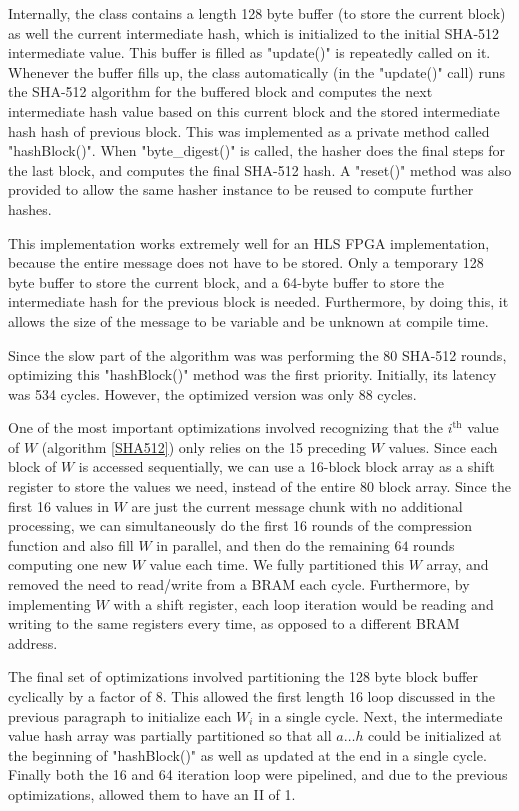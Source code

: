 Internally, the class contains a length 128 byte buffer (to store the current block)
as well the current intermediate hash,
which is initialized to the initial SHA-512 intermediate value. This buffer is filled as
"update()" is repeatedly called on it. Whenever the buffer fills up, the class
automatically (in the "update()" call) runs the SHA-512 algorithm for the buffered block
and computes the next intermediate hash value based on this current block and the stored intermediate hash hash of previous block.
This was implemented as a private method called "hashBlock()".
When "byte_digest()" is called, the hasher does the final steps for the last block,
and computes the final SHA-512 hash. A "reset()" method was also provided to allow the same hasher
instance to be reused to compute further hashes.

This implementation works extremely well for an HLS FPGA implementation, because
the entire message does not have to be stored. Only a temporary 128 byte buffer
to store the current block, and a 64-byte buffer to store the intermediate hash for the previous block is needed.
Furthermore, by doing this, it allows the size of the message to be variable and be unknown at compile time.

Since the slow part of the algorithm was was performing the 80 SHA-512 rounds,
optimizing this "hashBlock()" method was the first priority. Initially, its
latency was 534 cycles. However, the optimized version was only 88 cycles.

One of the most important optimizations
involved recognizing that the $i^{\text{th}}$ value of $W$ (algorithm \ref{SHA512}) only relies on the 15 preceding $W$ values.
Since each block of $W$ is accessed sequentially, we can use a 16-block block array as a shift register
to store the values we need, instead of the entire 80 block array. Since the first 16 values in $W$ are
just the current message chunk with no additional processing, we can simultaneously do the first 16
rounds of the compression function and also fill $W$ in parallel, and then do the remaining $64$ rounds
computing one new $W$ value each time. We fully partitioned this $W$ array, and removed the need
to read/write from a BRAM each cycle. Furthermore, by implementing $W$ with a shift register,
each loop iteration would be reading and writing to the same registers every time,
as opposed to a different BRAM address.

The final set of optimizations involved partitioning the 128 byte block buffer
cyclically by a factor of 8. This allowed the first length 16 loop discussed
in the previous paragraph to initialize each $W_i$ in a single cycle. Next, the
intermediate value hash array was partially partitioned so that all $a \ldots h$ could
be initialized at the beginning of "hashBlock()" as well as updated
at the end in a single cycle. Finally both the 16 and 64 iteration loop were
pipelined, and due to the previous optimizations, allowed them to have an II of 1.

